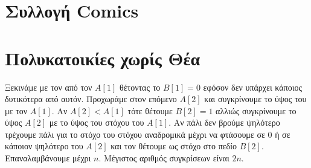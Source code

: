\documentclass[a4paper,10pt]{article} \usepackage{anysize}
\begin{document}
\section{Συλλογή Comics}
\section{Πολυκατοικίες χωρίς Θέα}
Ξεκινάμε με τον από τον $A[1]$ θέτοντας το $B[1]=0$ εφόσον δεν υπάρχει κάποιος
δυτικότερα από αυτόν. Προχωράμε στον επόμενο $A[2]$ και συγκρίνουμε το ύψος
του με τον $A[1]$. Αν $A[2]<A[1]$ τότε θέτουμε $B[2]=1$ αλλιώς συγκρίνουμε το
ύψος $A[2]$ με το ύψος του στόχου του $A[1]$. Αν πάλι δεν βρούμε ψηλότερο
τρέχουμε πάλι για το στόχο του στόχου αναδρομικά μέχρι να φτάσουμε σε 0
ή σε κάποιον ψηλότερο του $A[2]$ και τον θέτουμε ως στόχο στο πεδίο $B[2]$.
Επαναλαμβάνουμε μέχρι $n$. Μέγιστος αριθμός συγκρίσεων είναι $2n$.
\end{document}
